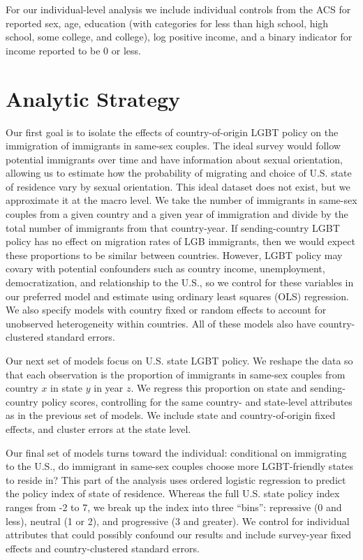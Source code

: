\documentclass[
  11pt,
]{article}
\begin{document}
For our individual-level analysis we include individual controls from the ACS for reported sex, age, education (with categories for less than high school, high school, some college, and college), log positive income, and a binary indicator for income reported to be 0 or less.

\hypertarget{analytic-strategy}{%
\section{Analytic Strategy}\label{analytic-strategy}}

Our first goal is to isolate the effects of country-of-origin LGBT policy on the immigration of immigrants in same-sex couples. The ideal survey would follow potential immigrants over time and have information about sexual orientation, allowing us to estimate how the probability of migrating and choice of U.S. state of residence vary by sexual orientation. This ideal dataset does not exist, but we approximate it at the macro level. We take the number of immigrants in same-sex couples from a given country and a given year of immigration and divide by the total number of immigrants from that country-year. If sending-country LGBT policy has no effect on migration rates of LGB immigrants, then we would expect these proportions to be similar between countries. However, LGBT policy may covary with potential confounders such as country income, unemployment, democratization, and relationship to the U.S., so we control for these variables in our preferred model and estimate using ordinary least squares (OLS) regression. We also specify models with country fixed or random effects to account for unobserved heterogeneity within countries. All of these models also have country-clustered standard errors.

Our next set of models focus on U.S. state LGBT policy. We reshape the data so that each observation is the proportion of immigrants in same-sex couples from country \(x\) in state \(y\) in year \(z\). We regress this proportion on state and sending-country policy scores, controlling for the same country- and state-level attributes as in the previous set of models. We include state and country-of-origin fixed effects, and cluster errors at the state level.

Our final set of models turns toward the individual: conditional on immigrating to the U.S., do immigrant in same-sex couples choose more LGBT-friendly states to reside in? This part of the analysis uses ordered logistic regression to predict the policy index of state of residence. Whereas the full U.S. state policy index ranges from -2 to 7, we break up the index into three ``bins'': repressive (0 and less), neutral (1 or 2), and progressive (3 and greater). We control for individual attributes that could possibly confound our results and include survey-year fixed effects and country-clustered standard errors.
\end{document}
